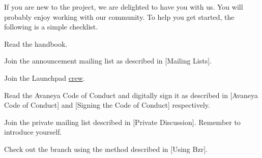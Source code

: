 

If you are new to the project, we are delighted to have you with us. You will probably enjoy working with our community. To help you get started, the following is a simple checklist.

\usesymbols[mvs]
\startitemize[1]
\item
Read the handbook.

\item
Join the announcement mailing list as described in [Mailing Lists].

\item
Join the Launchpad \href{https://launchpad.net/~avaneya/+join}{crew}.

\item
Read the Avaneya Code of Conduct and digitally sign it as described in [Avaneya Code of Conduct] and [Signing the Code of Conduct] respectively.

\item
Join the private mailing list described in [Private Discussion]. Remember to introduce yourself.

\item
Check out the branch using the method described in [Using Bzr].
\stopitemize

